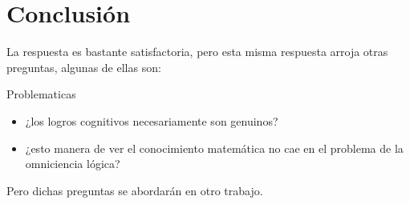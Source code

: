 \documentclass{beamer}
\begin{document}
  \section{Conclusión}
    \begin{frame}
      La respuesta es bastante satisfactoria, pero esta misma 
      respuesta arroja otras preguntas, algunas de ellas 
      son: 
      \begin{block}{Problematicas}
        \begin{itemize}
          \item ¿los logros cognitivos necesariamente son 
          genuinos?
          \item ¿esto manera de ver el conocimiento matemática no 
          cae en el problema de la omniciencia lógica?
        \end{itemize}
      \end{block}
      Pero dichas preguntas se abordarán en otro trabajo. 
    \end{frame}
\end{document}

